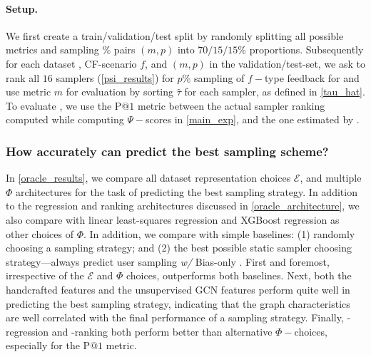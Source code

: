 \paragraph{Setup.} 
We first create a train/validation/test split by randomly splitting all possible metrics and sampling $\%$ pairs $(m, p)$ into $70/15/15\%$ proportions. Subsequently for each dataset \dataset, CF-scenario $f$, and $(m, p)$ in the validation/test-set, we ask \oracle to rank all $16$ samplers (\cref{psi_results}) for $p\%$ sampling of $f-$type feedback for \dataset and use metric $m$ for evaluation by sorting $\hat{\tau}$ for each sampler, as defined in \cref{tau_hat}. To evaluate \oracle, we use the P$@1$ metric between the actual sampler ranking computed while computing $\Psi-$scores in \cref{main_exp}, and the one estimated by \oracle.

\subsubsection{How accurately can \oracle predict the best sampling scheme? \ \ } In \cref{oracle_results}, we compare all dataset representation choices $\mathcal{E}$, and multiple $\Phi$ architectures for the task of predicting the best sampling strategy. In addition to the regression and ranking architectures discussed in \cref{oracle_architecture}, we also compare with linear least-squares regression and XGBoost regression \cite{xgboost} as other choices of $\Phi$. In addition, we compare \oracle with simple baselines: (1) randomly choosing a sampling strategy; and (2) the best possible static sampler choosing strategy---always predict user sampling \emph{w/} Bias-only \samplerprop. First and foremost, irrespective of the $\mathcal{E}$ and $\Phi$ choices, \oracle outperforms both baselines. Next, both the handcrafted features and the unsupervised GCN features perform quite well in predicting the best sampling strategy, indicating that the graph characteristics are well correlated with the final performance of a sampling strategy. Finally, \oracle-regression and \oracle-ranking both perform better than alternative $\Phi-$choices, especially for the P$@1$ metric. 


